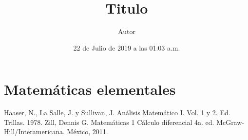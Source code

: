 \documentclass[10pt,a4paper]{book}
\author{Autor}										%
\title{Titulo}
\date{22 de Julio de 2019 a las 01:03 a.m.}
\theoremstyle{definition}
\begin{document}
\frontmatter
	
	

%

\mainmatter

\part{Matemáticas elementales}

	



\appendix
	


\backmatter

\begin{thebibliography}{99}
	 Haaser, N., La Salle, J. y Sullivan, J. Análisis Matemático I. Vol. 1 y 2. Ed. Trillas. 1978.
	 Zill, Dennis G. Matemáticas 1 Cálculo diferencial  4a. ed. McGraw-Hill/Interamericana. México, 2011.
\end{thebibliography}
\end{document}

